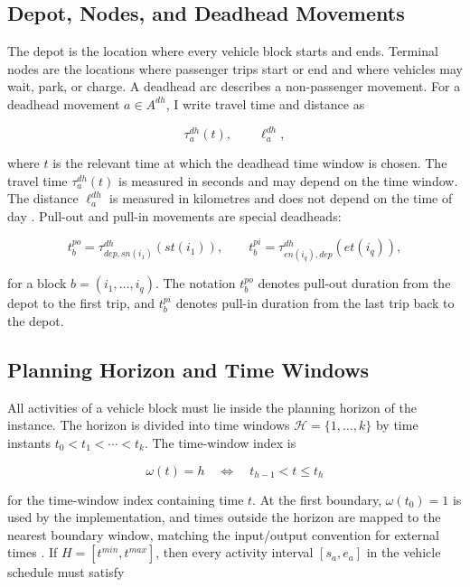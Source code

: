 \subsection{Depot, Nodes, and Deadhead Movements}

The depot is the location where every vehicle block starts and ends. Terminal
nodes are the locations where passenger trips start or end and where vehicles
may wait, park, or charge. A deadhead arc describes a non-passenger movement.
For a deadhead movement \(a\in A^{dh}\), I write travel time and distance as

\begin{equation}
\tau^{dh}_{a}(t),\qquad \ell^{dh}_{a},
\label{eq:deadhead-time-distance}
\end{equation}

where \(t\) is the relevant time at which the deadhead time window is chosen.
The travel time \(\tau^{dh}_a(t)\) is measured in seconds and may depend on the
time window. The distance \(\ell^{dh}_a\) is measured in kilometres and does
not depend on the time of day \cite{minoa-io}.
Pull-out and pull-in movements are special deadheads:

\begin{equation}
t_b^{po}=\tau^{dh}_{dep,sn(i_1)}(st(i_1)),
\qquad
t_b^{pi}=\tau^{dh}_{en(i_q),dep}(et(i_q)),
\label{eq:pull-times}
\end{equation}

for a block \(b=(i_1,\ldots,i_q)\). The notation \(t_b^{po}\) denotes
pull-out duration from the depot to the first trip, and \(t_b^{pi}\) denotes
pull-in duration from the last trip back to the depot.

\subsection{Planning Horizon and Time Windows}

All activities of a vehicle block must lie inside the planning horizon of the
instance. The horizon is divided into time windows
\(\mathcal{H}=\{1,\ldots,k\}\) by time instants
\(t_0<t_1<\cdots<t_k\). The time-window index is

\begin{equation}
\omega(t)=h
\quad\Longleftrightarrow\quad
t_{h-1}<t\le t_h
\label{eq:time-window-map}
\end{equation}

for the time-window index containing time \(t\). At the first boundary,
\(\omega(t_0)=1\) is used by the implementation, and times outside the horizon
are mapped to the nearest boundary window, matching the input/output
convention for external times \cite{minoa-io}. If \(H=[t^{min},t^{max}]\), then every
activity interval \([s_a,e_a]\) in the vehicle schedule must satisfy


